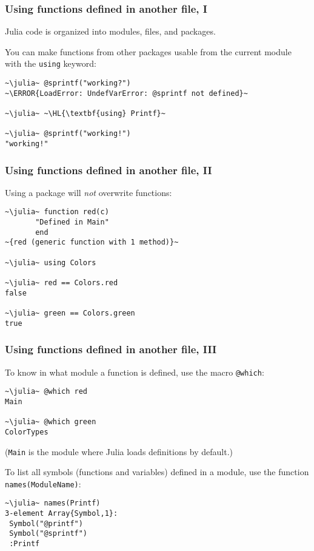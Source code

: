 \documentclass[english,serif,mathserif,xcolor=pdftex,dvipsnames,table]{beamer}
\begin{document}


\begin{frame}[fragile]
  \frametitle{Using functions defined in another file, I}
  \small

  Julia code is organized into modules, files, and packages.

  \+ You can make functions from other packages usable from the
  current module with the \texttt{using} keyword:
\begin{lstlisting}
~\julia~ @sprintf("working?")
~\ERROR{LoadError: UndefVarError: @sprintf not defined}~

~\julia~ ~\HL{\textbf{using} Printf}~

~\julia~ @sprintf("working!")
"working!"
\end{lstlisting}
\end{frame}

\begin{frame}
  \frametitle{Using functions defined in another file, II}
  Using a package will \emph{not} overwrite functions:
\begin{lstlisting}
~\julia~ function red(c)
       "Defined in Main"
       end
~{red (generic function with 1 method)}~

~\julia~ using Colors

~\julia~ red == Colors.red
false

~\julia~ green == Colors.green
true
\end{lstlisting}
\end{frame}


\begin{frame}
  \frametitle{Using functions defined in another file, III}
  \small
  To know in what module a function is defined, use the macro \texttt{@which}:
\begin{lstlisting}
~\julia~ @which red
Main

~\julia~ @which green
ColorTypes
\end{lstlisting}
  (\texttt{Main} is the module where Julia loads definitions by default.)

  \+
  To list all symbols (functions and variables) defined in a
  module, use the function \texttt{names(ModuleName)}:
\begin{lstlisting}
~\julia~ names(Printf)
3-element Array{Symbol,1}:
 Symbol("@printf")
 Symbol("@sprintf")
 :Printf
\end{lstlisting}
\end{frame}
\end{document}
